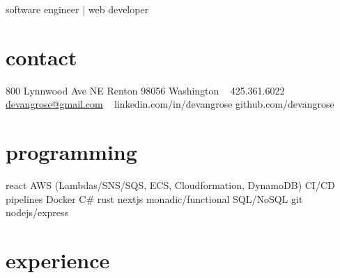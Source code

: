 \documentclass[]{friggeri-cv}
\begin{document}
       { software engineer | web developer }




\begin{aside}
  \section{contact}
    800 Lynnwood Ave NE
    Renton 98056
    Washington
    ~
    425.361.6022
    \href{mailto:devangrose@gmail.com}{devangrose@gmail.com}
    ~
    linkedin.com/in/devangrose
    github.com/devangrose
  \section{programming}
    react
    AWS (Lambdas/SNS/SQS, ECS, Cloudformation, DynamoDB)
    CI/CD pipelines
    Docker
    C\#
    rust
    nextjs
    monadic/functional
    SQL/NoSQL
    git
    nodejs/express

\end{aside}

\section{experience}
\end{document}
